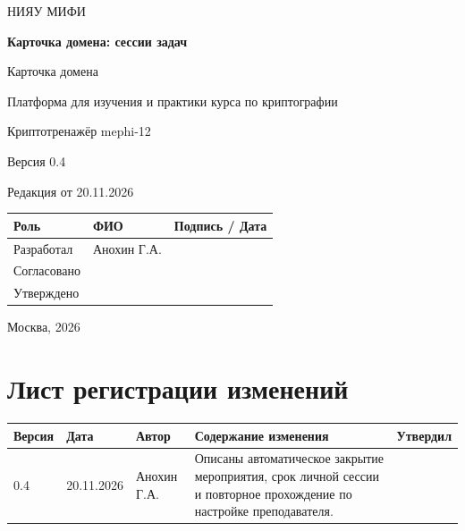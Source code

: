 \documentclass[12pt,a4paper]{article}
\begin{document}
\hypersetup{pageanchor=false}
\begin{titlepage}
  \thispagestyle{empty}
  \centering
  {\large НИЯУ МИФИ\par}
  \vspace*{3.5cm}
  {\LARGE\bfseries Карточка домена: сессии задач\par}
  \vspace{0.5cm}
  {\large Карточка домена\par}
  \vspace{0.6cm}
  {\large Платформа для изучения и практики курса по криптографии\par}
  {\large Криптотренажёр mephi-12\par}
  \vspace{0.7cm}
  {\large Версия 0.4\par}
  {\large Редакция от 20.11.2026\par}
  \vspace{1cm}
  \begin{tabularx}{\textwidth}{@{}p{3.4cm}Xp{4cm}@{}}
    \toprule
    Роль & ФИО & Подпись / Дата \\
    \midrule
    Разработал & Анохин Г.А. & \\
    \addlinespace[6pt]
    Согласовано & & \\
    \addlinespace[6pt]
    Утверждено & & \\
    \bottomrule
  \end{tabularx}
  \vfill
  {\large Москва, 2026\par}
\end{titlepage}
\hypersetup{pageanchor=true}

\section*{Лист регистрации изменений}
\begingroup\small\singlespacing
\noindent
\begin{tabularx}{\textwidth}{@{}p{1.2cm}p{2cm}p{2.5cm}Xp{1.8cm}@{}}
\toprule
Версия & Дата & Автор & Содержание изменения & Утвердил \\
\midrule
0.4 & 20.11.2026 & Анохин Г.А. & Описаны автоматическое закрытие мероприятия, срок личной сессии и повторное прохождение по настройке преподавателя. & \\
\bottomrule
\end{tabularx}
\endgroup
\clearpage
\begingroup\small\singlespacing
\tableofcontents
\endgroup
\clearpage
\end{document}
